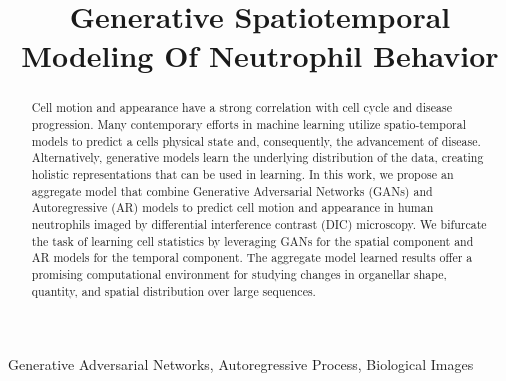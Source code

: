 \documentclass{article}
\title{Generative Spatiotemporal Modeling Of Neutrophil Behavior}
\newcommand{\squeezeup}{\vspace{-2.5mm}}
\begin{document}
%
\maketitle
%
\begin{abstract}
\small{
Cell motion and appearance have a strong correlation with cell cycle and disease progression. Many contemporary efforts in machine learning utilize spatio-temporal models to predict a cell\textquotesingle s physical state and, consequently, the advancement of disease. Alternatively, generative models learn the underlying distribution of the data, creating holistic representations that can be used in learning. In this work, we propose an aggregate model that combine Generative Adversarial Networks (GANs) and Autoregressive (AR) models to predict cell motion and appearance in human neutrophils imaged by differential interference contrast (DIC) microscopy. We bifurcate the task of learning cell statistics by leveraging GANs for the spatial component and AR models for the temporal component. The aggregate model learned results offer a promising computational environment for studying changes in organellar shape, quantity, and spatial distribution over large sequences.
}
\end{abstract}
\vspace{-0.2cm}
\begin{keywords}
\small{
Generative Adversarial Networks, Autoregressive Process, Biological Images
}
\end{keywords}
\vspace{-6pt}
\setlength{\parskip}{0em}
\squeezeup
\end{document}
